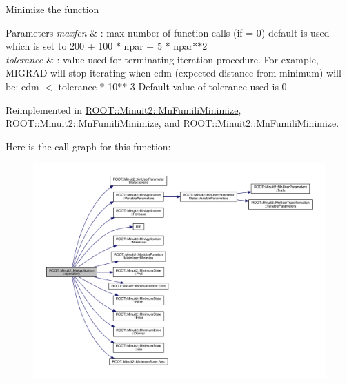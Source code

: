 Minimize the function 
\begin{DoxyParams}{Parameters}
{\em maxfcn} & \+: max number of function calls (if = 0) default is used which is set to 200 + 100 $\ast$ npar + 5 $\ast$ npar$\ast$$\ast$2 \\
\hline
{\em tolerance} & \+: value used for terminating iteration procedure. For example, M\+I\+G\+R\+AD will stop iterating when edm (expected distance from minimum) will be\+: edm $<$ tolerance $\ast$ 10$\ast$$\ast$-\/3 Default value of tolerance used is 0. \\
\hline
\end{DoxyParams}


Reimplemented in \mbox{\hyperlink{classROOT_1_1Minuit2_1_1MnFumiliMinimize_a408e4cc7d16335d7a9bfbb8765acec6d}{R\+O\+O\+T\+::\+Minuit2\+::\+Mn\+Fumili\+Minimize}}, \mbox{\hyperlink{classROOT_1_1Minuit2_1_1MnFumiliMinimize_a58da42cb9def0b42c424a3121987e77b}{R\+O\+O\+T\+::\+Minuit2\+::\+Mn\+Fumili\+Minimize}}, and \mbox{\hyperlink{classROOT_1_1Minuit2_1_1MnFumiliMinimize_a58da42cb9def0b42c424a3121987e77b}{R\+O\+O\+T\+::\+Minuit2\+::\+Mn\+Fumili\+Minimize}}.

Here is the call graph for this function\+:
\nopagebreak
\begin{figure}[H]
\begin{center}
\leavevmode
\includegraphics[width=350pt]{df/dd5/classROOT_1_1Minuit2_1_1MnApplication_a8908d50d5d4f7f011b94bd10e51eacf7_cgraph}
\end{center}
\end{figure}
\mbox{\label{classROOT_1_1Minuit2_1_1MnApplication_a67d746cf939174c8da6552636a11154a}} 
